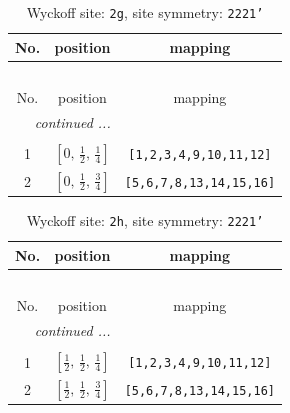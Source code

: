 \documentclass[fleqn,8pt]{jsarticle}
\begin{document}
\begin{longtable}{ccc}
\caption{Wyckoff site: {\tt 2g}, site symmetry: {\tt 2221'}}
 \\
 \hline \hline
No. & position & mapping \\ \hline \endfirsthead

\multicolumn{2}{l}{\tablename\ \thetable{}} \\
 \hline \hline
No. & position & mapping \\ \hline \endhead

 \hline \hline
\multicolumn{2}{r}{\footnotesize\it continued ...} \\ \endfoot

 \hline \hline
\multicolumn{2}{r}{} \\ \endlastfoot

1 & $\left[ 0,\, \frac{1}{2},\, \frac{1}{4} \right]$ & {\tt [1,2,3,4,9,10,11,12]} \\ \hline
2 & $\left[ 0,\, \frac{1}{2},\, \frac{3}{4} \right]$ & {\tt [5,6,7,8,13,14,15,16]} \\
\end{longtable}
\renewcommand{\arraystretch}{1.2}
\begin{longtable}{ccc}
\caption{Wyckoff site: {\tt 2h}, site symmetry: {\tt 2221'}}
 \\
 \hline \hline
No. & position & mapping \\ \hline \endfirsthead

\multicolumn{2}{l}{\tablename\ \thetable{}} \\
 \hline \hline
No. & position & mapping \\ \hline \endhead

 \hline \hline
\multicolumn{2}{r}{\footnotesize\it continued ...} \\ \endfoot

 \hline \hline
\multicolumn{2}{r}{} \\ \endlastfoot

1 & $\left[ \frac{1}{2},\, \frac{1}{2},\, \frac{1}{4} \right]$ & {\tt [1,2,3,4,9,10,11,12]} \\ \hline
2 & $\left[ \frac{1}{2},\, \frac{1}{2},\, \frac{3}{4} \right]$ & {\tt [5,6,7,8,13,14,15,16]} \\
\end{longtable}
\renewcommand{\arraystretch}{1.2}
\end{document}
